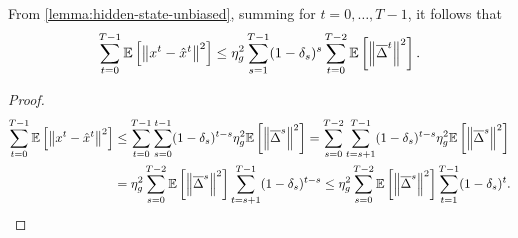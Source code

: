 \begin{corollary}  \label{cor:sum-unbiased-terms}
    From \cref{lemma:hidden-state-unbiased}, summing for $t = 0, \ldots, T-1$, it follows that
    \begin{equation}
        \sum_{t=0}^{T-1} \mathbb{E}\left[\left\lVert x^{t} - \hat x^{t}\right\rVert^2\right] \leq \eta_g^2 \sum_{s=1}^{T-1} (1-\delta_s)^s \sum_{t=0}^{T-2} \mathbb{E}\left[\left\lVert\overline{\Delta}^t\right\rVert^2\right].
    \end{equation}
\end{corollary}
\begin{proof}
    \begin{equation}
        \begin{aligned}
            \sum_{t=0}^{T-1} \mathbb{E}\left[\left\lVert x^{t} - \hat x^{t}\right\rVert^2\right] & \leq \sum_{t=0}^{T-1} \sum_{s=0}^{t-1} (1-\delta_s)^{t-s} \eta_g^2 \mathbb{E}\left[ \left\lVert\overline{\Delta}^s\right\rVert^2\right] = \sum_{s=0}^{T-2} \sum_{t=s+1}^{T-1} (1-\delta_s)^{t-s} \eta_g^2 \mathbb{E}\left[\left\lVert\overline{\Delta}^s\right\rVert^2\right] \\
                                                                 & = \eta_g^2 \sum_{s=0}^{T-2} \mathbb{E}\left[ \left\lVert\overline{\Delta}^s\right\rVert^2\right] \sum_{t=s+1}^{T-1} (1-\delta_s)^{t-s} \leq \eta_g^2\sum_{s=0}^{T-2} \mathbb{E}\left[ \left\lVert\overline{\Delta}^s\right\rVert^2\right] \sum_{t=1}^{T-1} (1-\delta_s)^t .
        \end{aligned}
    \end{equation}
\end{proof}

